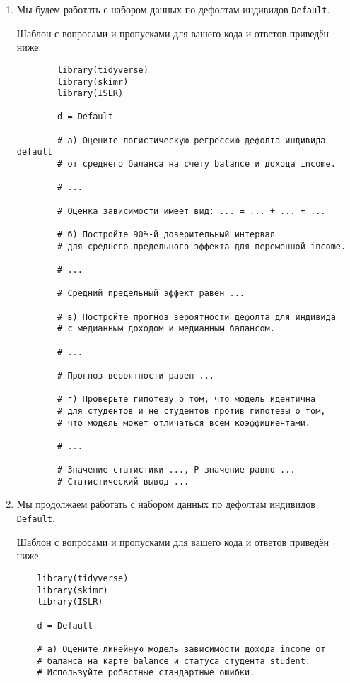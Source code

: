 \documentclass[12pt]{article}
\begin{document}
\begin{enumerate}
\newpage
    \item Мы будем работать с набором данных по дефолтам индивидов \verb|Default|.

    Шаблон с вопросами и пропусками для вашего кода и ответов приведён ниже. 

    \begin{verbatim}
        library(tidyverse)
        library(skimr)
        library(ISLR)

        d = Default

        # а) Оцените логистическую регрессию дефолта индивида default 
        # от среднего баланса на счету balance и дохода income. 

        # ...

        # Оценка зависимости имеет вид: ... = ... + ... + ...  

        # б) Постройте 90%-й доверительный интервал 
        # для среднего предельного эффекта для переменной income.

        # ...

        # Средний предельный эффект равен ...

        # в) Постройте прогноз вероятности дефолта для индивида 
        # с медианным доходом и медианным балансом. 

        # ...

        # Прогноз вероятности равен ...

        # г) Проверьте гипотезу о том, что модель идентична 
        # для студентов и не студентов против гипотезы о том,
        # что модель может отличаться всем коэффициентами. 

        # ...

        # Значение статистики ..., P-значение равно ... 
        # Статистический вывод ...

    \end{verbatim}

    \newpage
    \item Мы продолжаем работать с набором данных по дефолтам индивидов \verb|Default|.

    Шаблон с вопросами и пропусками для вашего кода и ответов приведён ниже. 

\begin{verbatim}
    library(tidyverse)
    library(skimr)
    library(ISLR)

    d = Default

    # а) Оцените линейную модель зависимости дохода income от
    # баланса на карте balance и статуса студента student. 
    # Используйте робастные стандартные ошибки. 


\end{verbatim}
\end{enumerate}
\end{document}
